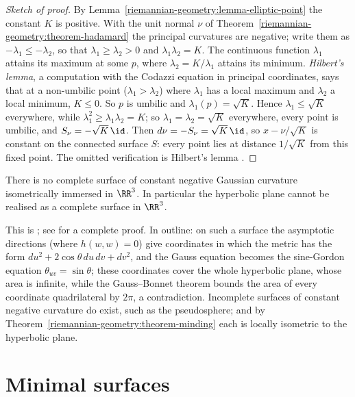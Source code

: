 \begin{proof}[Sketch of proof]
By Lemma~\ref{riemannian-geometry:lemma-elliptic-point} the constant $K$ is positive. With the unit normal $\nu$ of Theorem~\ref{riemannian-geometry:theorem-hadamard} the
principal curvatures are negative; write them as $-\lambda_1 \leq -\lambda_2$, so that $\lambda_1 \geq \lambda_2 > 0$ and $\lambda_1\lambda_2 = K$. The continuous function $\lambda_1$
attains its maximum at some $p$, where $\lambda_2 = K/\lambda_1$ attains its minimum. \emph{Hilbert's lemma}, a computation with the Codazzi equation in principal coordinates, says
that at a non-umbilic point ($\lambda_1 > \lambda_2$) where $\lambda_1$ has a local maximum and $\lambda_2$ a local minimum, $K \leq 0$. So $p$ is umbilic and
$\lambda_1(p) = \sqrt K$. Hence $\lambda_1 \leq \sqrt K$ everywhere, while $\lambda_1^2 \geq \lambda_1\lambda_2 = K$; so $\lambda_1 = \lambda_2 = \sqrt K$ everywhere, every point is umbilic,
and $S_\nu = -\sqrt K\,\id$. Then $d\nu = -S_\nu = \sqrt K\,\id$, so $x - \nu/\sqrt K$ is constant on the connected surface $S$: every point lies at distance $1/\sqrt K$ from this
fixed point. The omitted verification is Hilbert's lemma \cite[Chapter 5]{do-carmo-curves-surfaces}.
\end{proof}

\begin{theorem}[Hilbert]\label{riemannian-geometry:theorem-hilbert}
There is no complete surface of constant negative Gaussian curvature isometrically immersed in $\RR^3$. In particular the hyperbolic plane cannot be realised as a complete
surface in $\RR^3$.
\end{theorem}

This is \cite{hilbert-1901}; see \cite[Chapter 5]{do-carmo-curves-surfaces} for a complete proof. In outline: on such a surface the asymptotic directions (where $h(w, w) = 0$) give
coordinates in which the metric has the form $du^2 + 2\cos\theta\,du\,dv + dv^2$, and the Gauss equation becomes the sine-Gordon equation $\theta_{uv} = \sin\theta$; these
coordinates cover the whole hyperbolic plane, whose area is infinite, while the Gauss--Bonnet theorem bounds the area of every coordinate quadrilateral by $2\pi$, a contradiction.
Incomplete surfaces of constant negative curvature do exist, such as the pseudosphere; and by Theorem~\ref{riemannian-geometry:theorem-minding} each is locally isometric to
the hyperbolic plane.

\section{Minimal surfaces}\label{riemannian-geometry:section-minimal}

